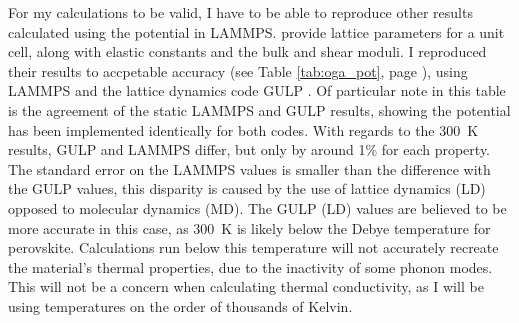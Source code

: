 For my calculations to be valid, I have to be able to reproduce other results calculated using the \citet{Oganov2000} potential in LAMMPS. \citeauthor{Oganov2000} provide lattice parameters for a unit cell, along with elastic constants and the bulk and shear moduli. I reproduced their results to accpetable accuracy (see Table \ref{tab:oga_pot}, page \pageref{tab:oga_pot}), using LAMMPS and the lattice dynamics code GULP \citep{Gale1997}. Of particular note in this table is the agreement of the static LAMMPS and GULP results, showing the potential has been implemented identically for both codes. With regards to the 300~K results, GULP and LAMMPS differ, but only by around 1\% for each property. The standard error on the LAMMPS values is smaller than the difference with the GULP values, this disparity is caused by the use of lattice dynamics (LD) opposed to molecular dynamics (MD). The GULP (LD) values are believed to be more accurate in this case, 
as 300~K is likely below the Debye temperature for perovskite. Calculations run below this temperature will not accurately recreate the material's thermal properties, due to the inactivity of some phonon modes. This will not be a concern when calculating thermal conductivity, as I will be using temperatures on the order of thousands of Kelvin.

